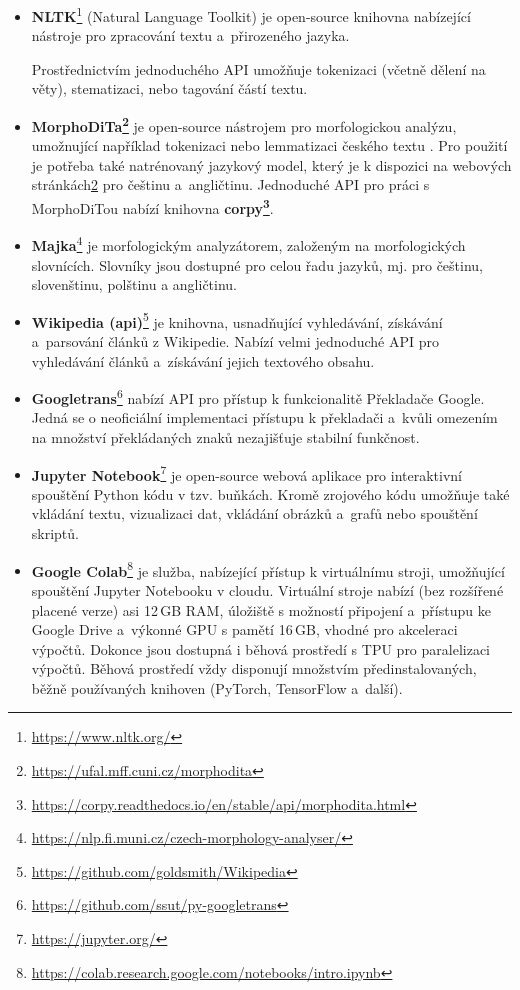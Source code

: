 \begin{itemize}
    \item \textbf{NLTK}\footnote{\url{https://www.nltk.org/}}
    (Natural Language Toolkit) je open-source knihovna nabízející nástroje pro zpracování textu a~přirozeného jazyka.\par Prostřednictvím jednoduchého API umožňuje tokenizaci (včetně dělení na věty), stematizaci, nebo tagování částí textu. 
    
    \item \textbf{MorphoDiTa\footnote{\label{note9}\url{https://ufal.mff.cuni.cz/morphodita}}}
    je open-source nástrojem pro morfologickou analýzu, umožnující například tokenizaci nebo lemmatizaci českého textu \cite{morphodita}. Pro použití je potřeba také natrénovaný jazykový model, který je k dispozici na webových stránkách\cref{note9} pro češtinu a~angličtinu. Jednoduché API pro práci s MorphoDiTou nabízí knihovna \textbf{corpy\footnote{\url{https://corpy.readthedocs.io/en/stable/api/morphodita.html}}}.
    
    \item \textbf{Majka}\footnote{\url{https://nlp.fi.muni.cz/czech-morphology-analyser/}}
    \cite{Majka} je morfologickým analyzátorem, založeným na morfologických slovnících. Slovníky jsou dostupné pro celou řadu jazyků, mj. pro češtinu, slovenštinu, polštinu a angličtinu.
    
    \item \textbf{Wikipedia (api)}\footnote{\url{https://github.com/goldsmith/Wikipedia}}
    je knihovna, usnadňující vyhledávání, získávání a~parsování člán\-ků z Wikipedie. Nabízí velmi jednoduché API pro vyhledávání článků a~získávání jejich textového obsahu.
    
    \item \textbf{Googletrans}\footnote{\url{https://github.com/ssut/py-googletrans}}
    nabízí API pro přístup k funkcionalitě Překladače Google. Jedná se o neoficiální implementaci přístupu k překladači a~kvůli omezením na množství překládaných znaků nezajišťuje stabilní funkčnost.
    
    \pagebreak
    \item \textbf{Jupyter Notebook}\footnote{\url{https://jupyter.org/}} 
    je open-source webová aplikace pro interaktivní spouštění \mbox{Python} kódu v tzv. buňkách. Kromě zrojového kódu umožňuje také vkládání textu, vizualizaci dat, vkládání obrázků a~grafů nebo spouštění skriptů.
    
    \item \textbf{Google Colab}\footnote{\url{https://colab.research.google.com/notebooks/intro.ipynb}}
    je služba, nabízející přístup k virtuálnímu stroji, umožňující spouštění Jupyter Notebooku v cloudu. 
    Virtuální stroje nabízí (bez rozšířené placené verze) asi 12\,GB RAM, úložiště s možností připojení a~přístupu ke Google Drive a~výkonné GPU s pamětí 16\,GB, vhodné pro akceleraci výpočtů. Dokonce jsou dostupná i běhová prostředí s TPU pro paralelizaci výpočtů. Běhová prostředí vždy disponují množstvím předinstalovaných, běžně používaných knihoven (PyTorch, TensorFlow a~další).
    
\end{itemize}

